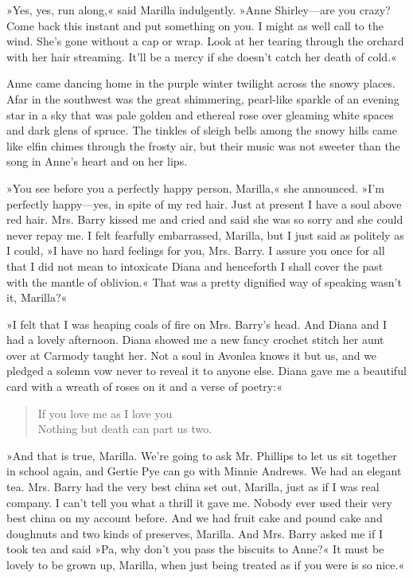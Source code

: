»Yes, yes, run along,« said Marilla indulgently. »Anne Shirley—are you crazy? Come back this instant and put something on you. I might as well call to the wind. She’s gone without a cap or wrap. Look at her tearing through the orchard with her hair streaming. It’ll be a mercy if she doesn’t catch her death of cold.«

Anne came dancing home in the purple winter twilight across the snowy places. Afar in the southwest was the great shimmering, pearl-like sparkle of an evening star in a sky that was pale golden and ethereal rose over gleaming white spaces and dark glens of spruce. The tinkles of sleigh bells among the snowy hills came like elfin chimes through the frosty air, but their music was not sweeter than the song in Anne’s heart and on her lips.

»You see before you a perfectly happy person, Marilla,« she announced. »I’m perfectly happy—yes, in spite of my red hair. Just at present I have a soul above red hair. Mrs. Barry kissed me and cried and said she was so sorry and she could never repay me. I felt fearfully embarrassed, Marilla, but I just said as politely as I could, »I have no hard feelings for you, Mrs. Barry. I assure you once for all that I did not mean to intoxicate Diana and henceforth I shall cover the past with the mantle of oblivion.« That was a pretty dignified way of speaking wasn’t it, Marilla?«

»I felt that I was heaping coals of fire on Mrs. Barry’s head. And Diana and I had a lovely afternoon. Diana showed me a new fancy crochet stitch her aunt over at Carmody taught her. Not a soul in Avonlea knows it but us, and we pledged a solemn vow never to reveal it to anyone else. Diana gave me a beautiful card with a wreath of roses on it and a verse of poetry:«

\begin{verse}
If you love me as I love you\\
Nothing but death can part us two.
\end{verse}

»And that is true, Marilla. We’re going to ask Mr. Phillips to let us sit together in school again, and Gertie Pye can go with Minnie Andrews. We had an elegant tea. Mrs. Barry had the very best china set out, Marilla, just as if I was real company. I can’t tell you what a thrill it gave me. Nobody ever used their very best china on my account before. And we had fruit cake and pound cake and doughnuts and two kinds of preserves, Marilla. And Mrs. Barry asked me if I took tea and said »Pa, why don't you pass the biscuits to Anne?« It must be lovely to be grown up, Marilla, when just being treated as if you were is so nice.«

